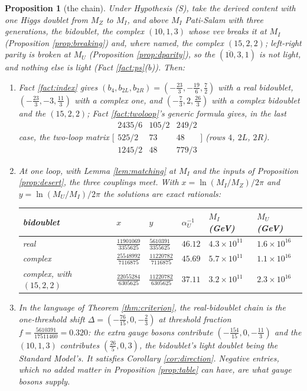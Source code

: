 \documentclass[11pt]{article}
\newtheorem{proposition}[theorem]{Proposition}
\theoremstyle{definition}
\newcommand{\Dl}{\Delta}
\begin{document}
\begin{proposition}[the chain]\label{prop:pschains}
Under Hypothesis (S), take the derived content with one Higgs doublet from $M_{Z}$ to $M_{I}$, and above $M_{I}$ Pati-Salam with three generations, the bidoublet, the complex $(10,1,3)$ whose vev breaks it at $M_{I}$ (Proposition \ref{prop:breaking}) and, where named, the complex $(15,2,2)$; left-right parity is broken at $M_{U}$ (Proposition \ref{prop:dparity}), so the $(\overline{10},3,1)$ is not light, and nothing else is light (Fact \ref{fact:ps}(b)). Then:
\begin{enumerate}
\item[(1)] Fact \ref{fact:index} gives $(b_{4}, b_{2L}, b_{2R}) = (-\tfrac{23}{3}, -\tfrac{19}{6}, \tfrac72)$ with a real bidoublet, $(-\tfrac{23}{3}, -3, \tfrac{11}{3})$ with a complex one, and $(-\tfrac73, 2, \tfrac{26}{3})$ with a complex bidoublet and the $(15,2,2)$; Fact \ref{fact:twoloop}'s generic formula gives, in the last case, the two-loop matrix $\bigl[\begin{smallmatrix} 2435/6 & 105/2 & 249/2 \\ 525/2 & 73 & 48 \\ 1245/2 & 48 & 779/3 \end{smallmatrix}\bigr]$ (rows $4$, $2L$, $2R$).
\item[(2)] At one loop, with Lemma \ref{lem:matching} at $M_{I}$ and the inputs of Proposition \ref{prop:desert}, the three couplings meet. With $x = \ln(M_{I}/M_{Z})/2\pi$ and $y = \ln(M_{U}/M_{I})/2\pi$ the solutions are exact rationals:
\begin{center}\small
\begin{tabular}{@{}llllll@{}}
\toprule
bidoublet & $x$ & $y$ & $\alpha_{U}^{-1}$ & $M_{I}$ (GeV) & $M_{U}$ (GeV) \\
\midrule
real & $\tfrac{11901069}{3355625}$ & $\tfrac{5610391}{3355625}$ & $46.12$ & $4.3 \times 10^{11}$ & $1.6 \times 10^{16}$ \\[2pt]
complex & $\tfrac{25548992}{7116875}$ & $\tfrac{11220782}{7116875}$ & $45.69$ & $5.7 \times 10^{11}$ & $1.1 \times 10^{16}$ \\[2pt]
complex, with $(15,2,2)$ & $\tfrac{22055284}{6305625}$ & $\tfrac{11220782}{6305625}$ & $37.11$ & $3.2 \times 10^{11}$ & $2.3 \times 10^{16}$ \\
\bottomrule
\end{tabular}
\end{center}
\item[(3)] In the language of Theorem \ref{thm:criterion}, the real-bidoublet chain is the one-threshold shift $\Dl = (-\tfrac{76}{15}, 0, -\tfrac23)$ at threshold fraction $f = \tfrac{5610391}{17511460} = 0.320$: the extra gauge bosons contribute $(-\tfrac{154}{15}, 0, -\tfrac{11}{3})$ and the $(10,1,3)$ contributes $(\tfrac{26}{5}, 0, 3)$, the bidoublet's light doublet being the Standard Model's. It satisfies Corollary \ref{cor:direction}. Negative entries, which no added matter in Proposition \ref{prop:table} can have, are what gauge bosons supply.

\end{enumerate}
\end{proposition}
\end{document}
